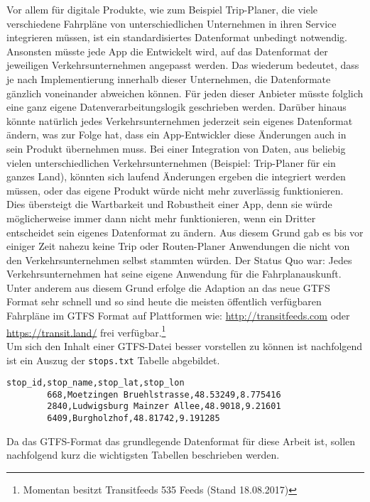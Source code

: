 \begin{newpage}
  		Vor allem für digitale Produkte, wie zum Beispiel Trip-Planer, die viele verschiedene Fahrpläne von unterschiedlichen Unternehmen in ihren Service integrieren müssen, ist ein standardisiertes Datenformat unbedingt notwendig. 
  		Ansonsten müsste jede App die Entwickelt wird, auf das Datenformat der jeweiligen Verkehrsunternehmen angepasst werden. Das wiederum bedeutet, dass je nach Implementierung innerhalb dieser Unternehmen, die Datenformate gänzlich voneinander abweichen können. Für jeden dieser Anbieter müsste folglich eine ganz eigene Datenverarbeitungslogik geschrieben werden.
      Darüber hinaus könnte natürlich jedes Verkehrsunternehmen jederzeit sein eigenes Datenformat ändern, was zur Folge hat, dass ein App-Entwickler diese Änderungen auch in sein Produkt übernehmen muss. Bei einer Integration von Daten, aus beliebig vielen unterschiedlichen Verkehrsunternehmen (Beispiel: Trip-Planer für ein ganzes Land), könnten sich laufend Änderungen ergeben die integriert werden müssen, oder das eigene Produkt würde nicht mehr zuverlässig funktionieren. Dies übersteigt die Wartbarkeit und Robustheit einer App, denn sie würde möglicherweise immer dann nicht mehr funktionieren, wenn ein Dritter entscheidet sein eigenes Datenformat zu ändern. Aus diesem Grund gab es bis vor einiger Zeit nahezu keine Trip oder Routen-Planer Anwendungen die nicht von den Verkehrsunternehmen selbst stammten würden. Der Status Quo war: Jedes Verkehrsunternehmen hat seine eigene Anwendung für die Fahrplanauskunft. Unter anderem aus diesem Grund erfolge die Adaption an das neue GTFS Format sehr schnell und so sind heute die meisten öffentlich verfügbaren Fahrpläne im GTFS Format auf Plattformen wie: \url{http://transitfeeds.com} oder \url{https://transit.land/} frei verfügbar.\footnote{Momentan besitzt Transitfeeds 535 Feeds (Stand 18.08.2017)}\\

      Um sich den Inhalt einer GTFS-Datei besser vorstellen zu können ist nachfolgend ist ein Auszug der \texttt{stops.txt} Tabelle abgebildet.

      \begin{lstlisting}[captionpos=b, caption=Auszug der ersten Zeilen von \texttt{stops.txt}, label=lst:gtfs-auszug]
        stop_id,stop_name,stop_lat,stop_lon
        668,Moetzingen Bruehlstrasse,48.53249,8.775416
        2840,Ludwigsburg Mainzer Allee,48.9018,9.21601
        6409,Burgholzhof,48.81742,9.191285
      \end{lstlisting}

  		Da das GTFS-Format das grundlegende Datenformat für diese Arbeit ist, sollen nachfolgend kurz die wichtigsten Tabellen beschrieben werden.


\end{newpage}
